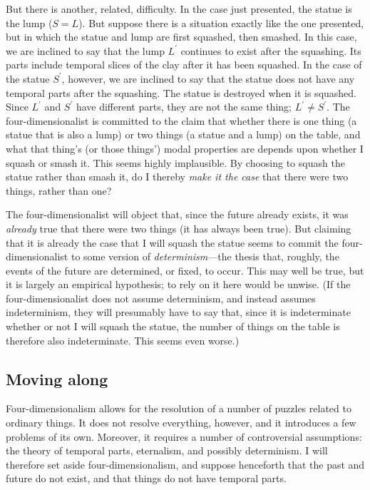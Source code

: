 \documentclass[11pt]{article}
\begin{document}
\begin{spacing}{1.5}
But there is another, related, difficulty.  In the case just
presented, the statue is the lump ($S = L$).  But suppose there is a
situation exactly like the one presented, but in which the statue and
lump are first squashed, then smashed.  In this case, we are inclined
to say that the lump $L^{\prime}$ continues to exist after the
squashing.  Its parts include temporal slices of the clay after it has
been squashed.  In the case of the statue $S^{\prime}$, however, we
are inclined to say that the statue does not have any temporal parts
after the squashing.  The statue is destroyed when it is squashed.
Since $L^{\prime}$ and $S^{\prime}$ have different parts, they are not
the same thing; $L^{\prime} \neq S^{\prime}$.  The four-dimensionalist
is committed to the claim that whether there is one thing (a statue
that is also a lump) or two things (a statue and a lump) on the table,
and what that thing's (or those things') modal properties are depends
upon whether I squash or smash it.  This seems highly implausible.  By
choosing to squash the statue rather than smash it, do I thereby {\em
  make it the case} that there were two things, rather than one?

The four-dimensionalist will object that, since the future already
exists, it was {\em already} true that there were two things (it has
always been true).  But claiming that it is already the case that I
will squash the statue seems to commit the four-dimensionalist to some
version of {\em determinism}---the thesis that, roughly, the events of
the future are determined, or fixed, to occur.  This may well be true,
but it is largely an empirical hypothesis; to rely on it here would be
unwise.  (If the four-dimensionalist does not assume determinism, and
instead assumes indeterminism, they will presumably have to say that,
since it is indeterminate whether or not I will squash the statue, the
number of things on the table is therefore also indeterminate.  This
seems even worse.)

\subsection{Moving along}
\label{4dc}
Four-dimensionalism allows for the resolution of a number of puzzles
related to ordinary things.  It does not resolve everything, however,
and it introduces a few problems of its own.  Moreover, it requires a
number of controversial assumptions: the theory of temporal parts,
eternalism, and possibly determinism.  I will therefore set aside
four-dimensionalism, and suppose henceforth that the past and future
do not exist, and that things do not have temporal parts.


\end{spacing}
\end{document}
